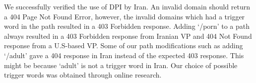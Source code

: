 We successfully verified the use of DPI by Iran. An invalid domain should return a 404 Page Not Found Error, however, the invalid domains which had a trigger word in the path resulted in a 403 Forbidden response. Adding `/porn' to a path always resulted in a 403 Forbidden response from Iranian VP and 404 Not Found response from a U.S-based VP. Some of our path modifications such as adding `/adult' gave a 404 response in Iran instead of the expected 403 response. This might be because `adult' is not a trigger word in Iran. Our choice of possible trigger words was obtained through online research.\\ 


